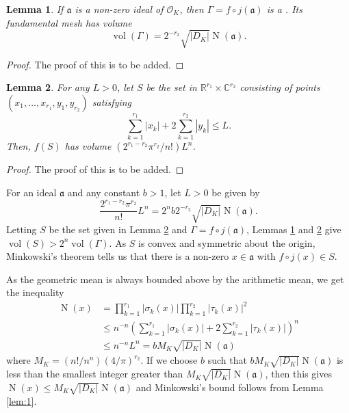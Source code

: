 \documentclass[12pt]{article}
\newtheorem{lemma}{Lemma}
\begin{document}
\begin{lemma}\label{lem:2}
If $\mathfrak{a}$ is a non-zero ideal of $\mathcal{O}_K$, then $\Gamma=f\circ j(\mathfrak{a})$ is a . Its fundamental mesh has volume
\begin{equation*}
\operatorname{vol}(\Gamma)=2^{-r_2}\sqrt{|D_K|}\operatorname{N}(\mathfrak{a}).
\end{equation*}
\end{lemma}
\begin{proof}
The proof of this is to be added.
\end{proof}

\begin{lemma}\label{lem:3}
For any $L>0$, let $S$ be the set in $\mathbb{R}^{r_1}\times\mathbb{C}^{r_2}$ consisting of points $(x_1,\ldots,x_{r_1},y_1,y_{r_2})$ satisfying
\begin{equation*}
\sum_{k=1}^{r_1}|x_k|+2\sum_{k=1}^{r_2}|y_k|\le L.
\end{equation*}
Then, $f(S)$ has volume $(2^{r_1-r_2}\pi^{r_2}/n!) L^n$.
\end{lemma}
\begin{proof}
The proof of this is to be added.
\end{proof}


For an ideal $\mathfrak{a}$ and any constant $b>1$, let $L>0$ be given by
\begin{equation*}
\frac{2^{r_1-r_2}\pi^{r_2}}{n!} L^n=2^nb2^{-r_2}\sqrt{|D_K|}\operatorname{N}(\mathfrak{a}).
\end{equation*}
Letting $S$ be the set given in Lemma \ref{lem:3} and $\Gamma=f\circ j(\mathfrak{a})$, Lemmas \ref{lem:2} and \ref{lem:3} give $\operatorname{vol}(S)>2^n\operatorname{vol}(\Gamma)$. As $S$ is convex and symmetric about the origin, Minkowski's theorem tells us that there is a non-zero $x\in\mathfrak{a}$ with $f\circ j(x)\in S$.

As the geometric mean is always bounded above by the arithmetic mean, we get the inequality
\begin{equation*}\begin{split}
\operatorname{N}(x)&=\prod_{k=1}^{r_1}|\sigma_k(x)|\prod_{k=1}^{r_2}|\tau_k(x)|^2\\
&\le n^{-n}\left(\sum_{k=1}^{r_1}|\sigma_k(x)|+2\sum_{k=1}^{r_2}|\tau_k(x)|\right)^n\\
&\le n^{-n}L^n=b M_K\sqrt{|D_K|}\operatorname{N}(\mathfrak{a})
\end{split}\end{equation*}
where $M_K=(n!/n^n)(4/\pi)^{r_2}$. If we choose $b$ such that $bM_K\sqrt{|D_K|}\operatorname{N}(\mathfrak{a})$ is less than the smallest integer greater than $M_K\sqrt{|D_K|}\operatorname{N}(\mathfrak{a})$, then this gives $\operatorname{N}(x)\le M_K\sqrt{|D_K|}\operatorname{N}(\mathfrak{a})$ and Minkowski's bound follows from Lemma \ref{lem:1}.

\end{document}
